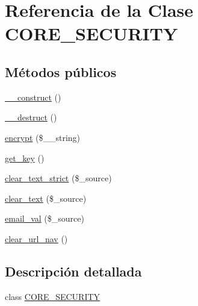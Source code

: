 \hypertarget{class_c_o_r_e___s_e_c_u_r_i_t_y}{\section{Referencia de la Clase C\-O\-R\-E\-\_\-\-S\-E\-C\-U\-R\-I\-T\-Y}
\label{class_c_o_r_e___s_e_c_u_r_i_t_y}
}
\subsection*{Métodos públicos}
\begin{DoxyCompactItemize}
\item 
\hyperlink{class_c_o_r_e___s_e_c_u_r_i_t_y_a095c5d389db211932136b53f25f39685}{\-\_\-\-\_\-construct} ()
\item 
\hyperlink{class_c_o_r_e___s_e_c_u_r_i_t_y_a421831a265621325e1fdd19aace0c758}{\-\_\-\-\_\-destruct} ()
\item 
\hyperlink{class_c_o_r_e___s_e_c_u_r_i_t_y_a5260703d06813a9a9fc8e5dd95ada8ba}{encrypt} (\$\-\_\-\-\_\-string)
\item 
\hyperlink{class_c_o_r_e___s_e_c_u_r_i_t_y_a0395526ae8329a45cfee884e817bcaf4}{get\-\_\-key} ()
\item 
\hyperlink{class_c_o_r_e___s_e_c_u_r_i_t_y_a32f3868e35b4c69308f50424c1dec05f}{clear\-\_\-text\-\_\-strict} (\$\-\_\-source)
\item 
\hyperlink{class_c_o_r_e___s_e_c_u_r_i_t_y_acedcf5bb123cedc39c507da2530af795}{clear\-\_\-text} (\$\-\_\-source)
\item 
\hyperlink{class_c_o_r_e___s_e_c_u_r_i_t_y_ac36c94a68d7893be80e01fb117256af1}{email\-\_\-val} (\$\-\_\-source)
\item 
\hyperlink{class_c_o_r_e___s_e_c_u_r_i_t_y_a92c19f2316b297b6cbc98520bf93e865}{clear\-\_\-url\-\_\-nav} ()
\end{DoxyCompactItemize}


\subsection{Descripción detallada}
class \hyperlink{class_c_o_r_e___s_e_c_u_r_i_t_y}{C\-O\-R\-E\-\_\-\-S\-E\-C\-U\-R\-I\-T\-Y} 

